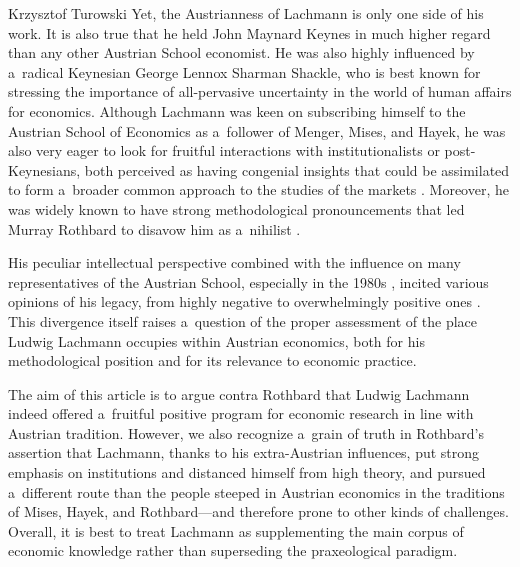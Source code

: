 \begin{artengenv}{Krzysztof Turowski}
Yet, the Austrianness of Lachmann is only one side of his work.
It is also true that he held John Maynard Keynes in much higher regard than any other Austrian School economist. He was also highly influenced by a~radical Keynesian George Lennox Sharman Shackle, who is best known for stressing the importance of all-pervasive uncertainty in the world of human affairs for economics.
Although Lachmann was keen on subscribing himself to the Austrian School of Economics as a~follower of Menger, Mises, and Hayek, he was also very eager to look for fruitful interactions with institutionalists or post-Keynesians, both perceived as having congenial insights that could be assimilated to form a~broader common approach to the studies of the markets \parencite[8]{lavoie-introduction}.
Moreover, he was widely known to have strong methodological pronouncements that led Murray Rothbard to disavow him as a~nihilist \parencite*[52--53]{rothbard-present}.

His peculiar intellectual perspective combined with the influence on many representatives of the Austrian School, especially in the 1980s \parencite[139--140]{vaughn1998austrian}, incited various opinions of his legacy, from highly negative \parencite[82]{rothbard-present} to overwhelmingly positive ones \parencite[1]{lavoie-introduction}.
This divergence itself raises a~question of the proper assessment of the place Ludwig Lachmann occupies within Austrian economics, both for his methodological position and for its relevance to economic practice.

The aim of this article is to argue contra Rothbard that Ludwig Lachmann indeed offered a~fruitful positive program for economic research in line with Austrian tradition.
However, we also recognize a~grain of truth in Rothbard's assertion that Lachmann, thanks to his extra-Austrian influences, put strong emphasis on institutions and distanced himself from high theory, and pursued a~different route than the people steeped in Austrian economics in the traditions of Mises, Hayek, and Rothbard---and therefore prone to other kinds of challenges.
Overall, it is best to treat Lachmann as supplementing the main corpus of economic knowledge rather than superseding the praxeological paradigm.


\end{artengenv}
